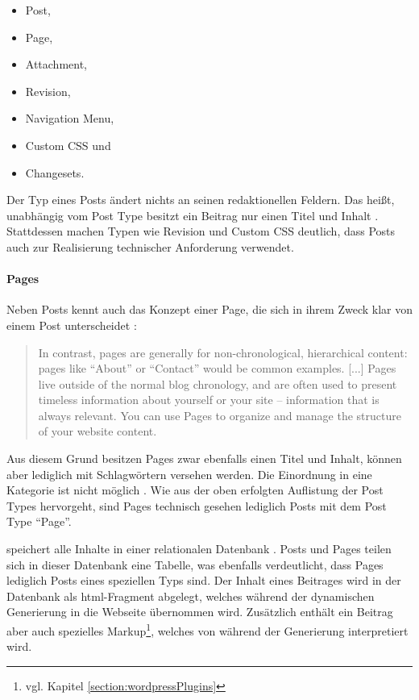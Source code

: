         \begin{itemize}
            \item Post,
            \item Page,
            \item Attachment,
            \item Revision,
            \item Navigation Menu,
            \item Custom CSS und
            \item Changesets.
        \end{itemize}

        Der Typ eines Posts ändert nichts an seinen redaktionellen Feldern.
        Das heißt, unabhängig vom Post Type besitzt ein Beitrag nur
        einen Titel und Inhalt
        \cite{wordpress:Posts, wordpress:PostTypes}.
        Stattdessen machen Typen wie Revision und Custom CSS deutlich,
        dass {\wordpress} Posts auch zur Realisierung technischer Anforderung verwendet.

        \paragraph*{Pages}
        Neben Posts kennt {\wordpress} auch das Konzept einer Page,
        die sich in ihrem Zweck klar von einem Post unterscheidet
        \cite{wordpress:Pages}:

        \begin{quote}
            In contrast, pages are generally for non-chronological,
            hierarchical content: pages like "`About"' or "`Contact"'
            would be common examples.
            [...]
            Pages live outside of the normal blog chronology,
            and are often used to present timeless information about
            yourself or your site -- information that is always relevant.
            You can use Pages to organize and manage the structure of your website content.
        \end{quote}

        Aus diesem Grund besitzen Pages zwar ebenfalls einen Titel und Inhalt,
        können aber lediglich mit Schlagwörtern versehen werden.
        Die Einordnung in eine Kategorie ist nicht möglich
        \cite{wordpress:Pages}.
        Wie aus der oben erfolgten Auflistung der Post Types hervorgeht,
        sind Pages technisch gesehen lediglich Posts mit dem Post Type "`Page"'.

        {\wordpress} speichert alle Inhalte in einer relationalen Datenbank \cite{wordpress:Database}.
        Posts und Pages teilen sich in dieser Datenbank eine Tabelle,
        was ebenfalls verdeutlicht, dass Pages lediglich Posts eines speziellen Typs sind.
        Der Inhalt eines Beitrages wird in der Datenbank als \gls{html}-Fragment abgelegt,
        welches während der dynamischen Generierung in die Webseite übernommen wird.
        Zusätzlich enthält ein Beitrag aber auch spezielles Markup\footnote{vgl. Kapitel \ref{section:wordpressPlugins}},
        welches von {\wordpress} während der Generierung interpretiert wird.

